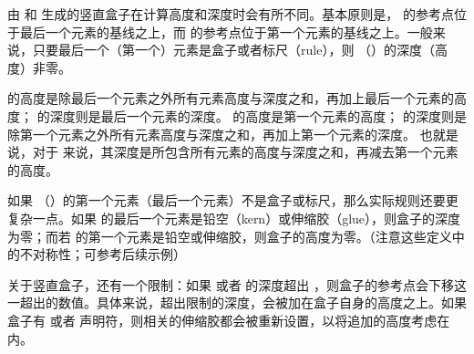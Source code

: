 \documentclass{book}
\begin{document}
由  和  生成的竖直盒子在计算高度和深度时会有所不同。基本原则是， 的参考点位于最后一个元素的基线之上，而  的参考点位于第一个元素的基线之上。一般来说，只要最后一个（第一个）元素是盒子或者标尺（rule），则 （）的深度（高度）非零。

 的高度是除最后一个元素之外所有元素高度与深度之和，再加上最后一个元素的高度； 的深度则是最后一个元素的深度。 的高度是第一个元素的高度； 的深度则是除第一个元素之外所有元素高度与深度之和，再加上第一个元素的深度。%
也就是说，对于  来说，其深度是所包含所有元素的高度与深度之和，再减去第一个元素的高度。

如果 （）的第一个元素（最后一个元素）不是盒子或标尺，那么实际规则还要更复杂一点。如果  的最后一个元素是铅空（kern）或伸缩胶（glue），则盒子的深度为零；而若  的第一个元素是铅空或伸缩胶，则盒子的高度为零。（注意这些定义中的不对称性；可参考后续示例）

关于竖直盒子，还有一个限制：如果  或者  的深度超出 ，则盒子的参考点会下移这一超出的数值。具体来说，超出限制的深度，会被加在盒子自身的高度之上。如果盒子有  或者  声明符，则相关的伸缩胶都会被重新设置，以将追加的高度考虑在内。
\end{document}
